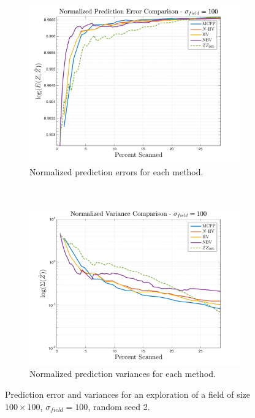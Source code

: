 \begin{figure}[htb!]
    \centering
    \begin{subfigure}[t]{0.75\textwidth}
        \centering
        \includegraphics[width=\linewidth]{figures/normalized_errors_30p_100x100_sf_100_seed_2_app_10.png}
        \captionsetup{skip=0.20\baselineskip,size=footnotesize}
        \caption{Normalized prediction errors for each method.}
    \end{subfigure}%
    \\
    \begin{subfigure}[t]{0.75\textwidth}
        \centering
        \includegraphics[width=\linewidth]{figures/normalized_variances_30p_100x100_sf_100_seed_2_app_10.png}
        \captionsetup{skip=0.20\baselineskip,size=footnotesize}
        \caption{Normalized prediction variances for each method.}
    \end{subfigure}%
    \captionsetup{skip=0.20\baselineskip}
    \caption{Prediction error and variances for an exploration of a field of size $100 \times 100$, $\sigma_{field} = 100$, random seed 2.}
    \label{fig:errvar100}
\end{figure}

